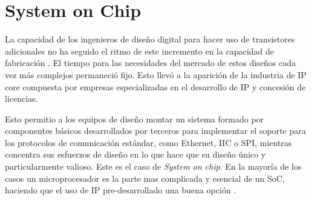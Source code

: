 	

\section{System on Chip}

 La capacidad de los ingenieros de diseño digital para hacer uso de transistores adicionales no ha seguido el ritmo de este incremento en la capacidad de fabricación \cite{Etiqueta05}. El tiempo para las necesidades del mercado de estos diseños cada vez más complejos permaneció fijo. 
Esto llevó a la aparición de la industria de IP core compuesta por empresas especializadas en el desarrollo de IP y concesión de licencias.

Esto permitio a los equipos de diseño montar un sistema formado por componentes básicos desarrollados por terceros para implementar el soporte para los protocolos de comunicación estándar, como Ethernet, IIC o SPI, mientras concentra sus esfuerzos de diseño en  lo que hace que su diseño único y particularmente valioso. Este es el caso de \textit{System on chip}.
En la mayoría de los casos un microprocesador es la parte mas complicada y esencial de un SoC, haciendo que el uso de IP pre-desarrollado una buena opción .



